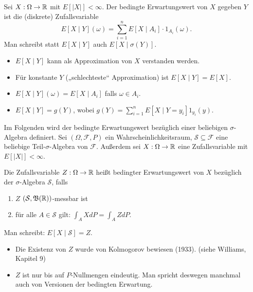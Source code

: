 \documentclass[a4paper,twoside,DIV15,BCOR12mm]{scrbook}
\newcommand{\cF}{\mathcal F}
\newcommand{\borel}{{\mathfrak B}}
\begin{document}
\begin{definition}
Sei $X:\Omega \to \mathbb{R}$ mit $E[|X|]<\infty$. Der bedingte Erwartungswert von $X$ gegeben $Y$ ist die (diskrete) Zufallsvariable 
\[
E[X\mid Y](\omega) = \sum_{i=1}^n E[X\mid A_i] \cdot 1_{A_i}(\omega).
\]
Man schreibt statt $E[X\mid Y]$ auch $E[X\mid \sigma(Y)]$.
\end{definition}

\begin{bemerkung}
\begin{itemize}
\item $E[X\mid Y]$ kann als Approximation von $X$ verstanden werden.
\item Für konstante $Y$ („schlechteste“ Approximation) ist $E[X\mid Y] = E[X]$.
\item $E[X\mid Y](\omega) = E[X\mid A_i]$ falls $\omega\in A_i$.
\item $E[X\mid Y] = g(Y)$, wobei $g(Y) = \sum_{i=1}^n E[X\mid Y=y_i]1_{y_i}(y)$.
\end{itemize}
\end{bemerkung}

Im Folgenden wird der bedingte Erwartungswert bezüglich einer beliebigen $\sigma$-Algebra definiert. Sei $(\Omega,\cF,P)$ ein Wahrscheinlichkeitsraum, $\mathcal S\subseteq \cF$ eine beliebige Teil-$\sigma$-Algebra von $\cF$. Außerdem sei $X:\Omega\to\mathbb{R}$ eine Zufallsvariable mit $E[|X|]<\infty$.

\begin{definition}
\label{def:2.1.5}Die Zufallsvariable $Z:\Omega\to\mathbb{R}$ heißt bedingter Erwartungswert von $X$ bezüglich der $\sigma$-Algebra $\mathcal S$, falls
\begin{enumerate}
\item $Z$ $(\mathcal S,\borel(\MdR))$-messbar ist
\item für alle $A\in \mathcal S$ gilt: $\int_A XdP = \int_AZ dP$.
\end{enumerate}
Man schreibt: $E[X\mid \mathcal S] = Z$.
\end{definition}


\begin{bemerkung}
\begin{itemize}
\item Die Existenz von $Z$ wurde von Kolmogorov bewiesen (1933). (siehe Williams, Kapitel 9)
\item $Z$ ist nur bis auf $P$-Nullmengen eindeutig. Man spricht deswegen manchmal auch von Versionen der bedingten Erwartung.
\end{itemize}
\end{bemerkung}
\end{document}
